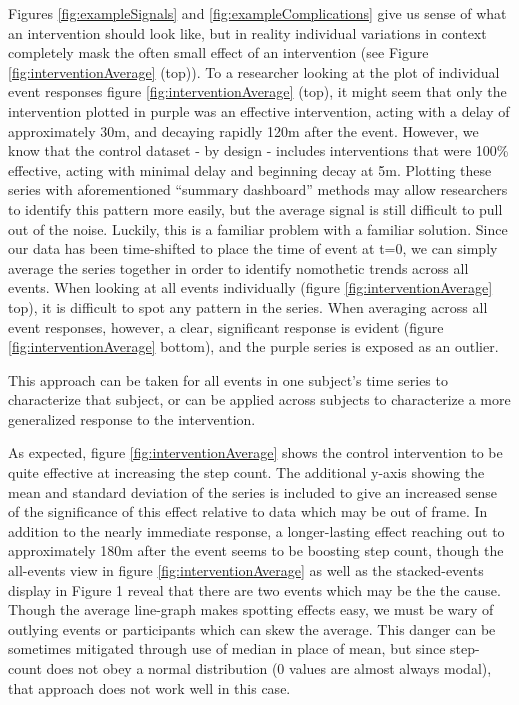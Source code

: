 Figures \ref{fig:exampleSignals} and \ref{fig:exampleComplications} give us sense of what an intervention should look like, but in reality individual variations in context completely mask the often small effect of an intervention (see Figure \ref{fig:interventionAverage} (top)).
To a researcher looking at the plot of individual event responses figure \ref{fig:interventionAverage} (top), it might seem that only the intervention plotted in purple was an effective intervention, acting with a delay of approximately 30m, and decaying rapidly 120m after the event.
However, we know that the control dataset - by design - includes interventions that were 100\% effective, acting with minimal delay and beginning decay at 5m.
Plotting these series with aforementioned ``summary dashboard'' methods may allow researchers to identify this pattern more easily, but the average signal is still difficult to pull out of the noise.
Luckily, this is a familiar problem with a familiar solution.
Since our data has been time-shifted to place the time of event at t=0, we can simply average the series together in order to identify nomothetic trends across all events.
When looking at all events individually (figure \ref{fig:interventionAverage} top), it is difficult to spot any pattern in the series.
When averaging across all event responses, however, a clear, significant response is evident (figure \ref{fig:interventionAverage} bottom), and the purple series is exposed as an outlier.

This approach can be taken for all events in one subject's time series to characterize that subject, or can be applied across subjects to characterize a more generalized response to the intervention.

As expected, figure \ref{fig:interventionAverage} shows the control intervention to be quite effective at increasing the step count.
The additional y-axis showing the mean and standard deviation of the series is included to give an increased sense of the significance of this effect relative to data which may be out of frame.
In addition to the nearly immediate response, a longer-lasting effect reaching out to approximately 180m after the event seems to be boosting step count, though the all-events view in figure \ref{fig:interventionAverage} as well as the stacked-events display in Figure 1 reveal that there are two events which may be the the cause.
Though the average line-graph makes spotting effects easy, we must be wary of outlying events or participants which can skew the average.
This danger can be sometimes mitigated through use of median in place of mean, but since step-count does not obey a normal distribution (0 values are almost always modal), that approach does not work well in this case.

